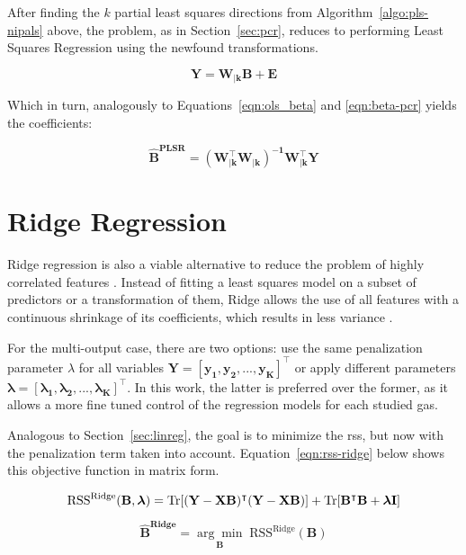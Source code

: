 After finding the $k$ partial least squares directions from Algorithm~\ref{algo:pls-nipals} above, the problem, as in Section~\ref{sec:pcr}, reduces to performing Least Squares Regression using the newfound transformations.

	\begin{equation}
	\label{eqn:plsr}
	\mathbf{Y = W_{|k} B + E}
\end{equation}

Which in turn, analogously to Equations~\ref{eqn:ols_beta} and \ref{eqn:beta-pcr} yields the coefficients:

\begin{equation}
	\label{eqn:beta-plsr}
	\mathbf{\hat{B}^{\text{PLSR}} = (W_{|k}^\intercal W_{|k})^{-1}W_{|k}^\intercal Y}
\end{equation}

\section{Ridge Regression}
\label{sec:ridge}

Ridge regression is also a viable alternative to reduce the problem of highly correlated features \parencite{friedman2001}. Instead of fitting a least squares model on a subset of predictors or a transformation of them, Ridge allows the use of all features with a continuous shrinkage of its coefficients, which results in less variance \parencite{friedman2001}.

For the multi-output case, there are two options: use the same penalization parameter $\lambda$ for all variables $\mathbf{Y = [y_1, y_2, ... , y_K]^\intercal}$ or apply different parameters $\mathbf{\boldsymbol{\lambda} = [\lambda_1, \lambda_2, ... , \lambda_K]^\intercal}$. In this work, the latter is preferred over the former, as it allows a more fine tuned control of the regression models for each studied gas.

Analogous to Section~\ref{sec:linreg}, the goal is to minimize the \acrshort{rss}, but now with the penalization term taken into account. Equation~\ref{eqn:rss-ridge} below shows this objective function in matrix form.

\begin{equation} 
	\label{eqn:rss-ridge}
	\text{RSS}^{\text{Ridge}}(\mathbf{B, \boldsymbol{\lambda} }) = \operatorname{Tr} [\mathbf{(Y-XB)^\intercal (Y-XB)}] + \operatorname{Tr}[\mathbf{B^\intercal B + \boldsymbol{\lambda} I}]
\end{equation}

\begin{equation}
	\label{eqn:betahat-ridge}
	\mathbf{\hat{B}^\text{Ridge}} = \underset{\mathbf{B}}{\arg\min} 	\; \text{RSS}^{\text{Ridge}}(\mathbf{B})
\end{equation}	

